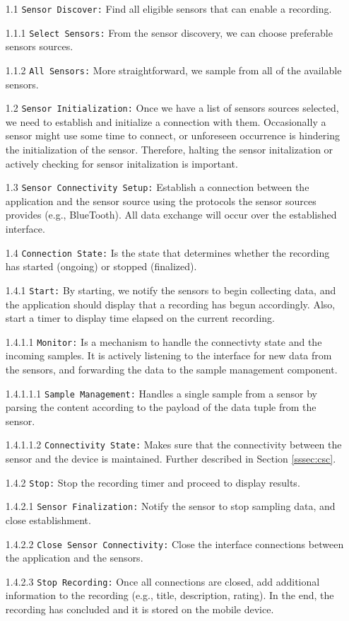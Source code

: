 \begin{itemize}
    \item[1.1] \verb|Sensor Discover:| Find all eligible sensors that can enable a recording.
    \item[1.1.1] \verb|Select Sensors:| From the sensor discovery, we can choose preferable sensors sources.
    \item[1.1.2] \verb|All Sensors:| More straightforward, we sample from all of the available sensors.
    \item[1.2] \verb|Sensor Initialization:| Once we have a list of sensors sources selected, we need to establish and initialize a connection with them. Occasionally a sensor might use some time to connect, or unforeseen occurrence is hindering the initialization of the sensor. Therefore, halting the sensor initalization or actively checking for sensor initalization is important. 
    \item[1.3] \verb|Sensor Connectivity Setup:| Establish a connection between the application and the sensor source using the protocols the sensor sources provides (e.g., BlueTooth). All data exchange will occur over the established interface. 
    \item[1.4] \verb|Connection State:| Is the state that determines whether the recording has started (ongoing) or stopped (finalized).
    \item[1.4.1] \verb|Start:| By starting, we notify the sensors to begin collecting data, and the application should display that a recording has begun accordingly. Also, start a timer to display time elapsed on the current recording. 
    \item[1.4.1.1] \verb|Monitor:| Is a mechanism to handle the connectivty state and the incoming samples. It is actively listening to the interface for new data from the sensors, and forwarding the data to the sample management component.  
    \item[1.4.1.1.1] \verb|Sample Management:| Handles a single sample from a sensor by parsing the content according to the payload of the data tuple from the sensor.
    \item[1.4.1.1.2] \verb|Connectivity State:| Makes sure that the connectivity between the sensor and the device is maintained. Further described in Section \ref{sssec:csc}.
    \item[1.4.2] \verb|Stop:| Stop the recording timer and proceed to display results.
    \item[1.4.2.1] \verb|Sensor Finalization:| Notify the sensor to stop sampling data, and close establishment.
    \item[1.4.2.2] \verb|Close Sensor Connectivity:| Close the interface connections between the application and the sensors. 
    \item[1.4.2.3] \verb|Stop Recording:| Once all connections are closed, add additional information to the recording (e.g., title, description, rating). In the end, the recording has concluded and it is stored on the mobile device.
\end{itemize}

